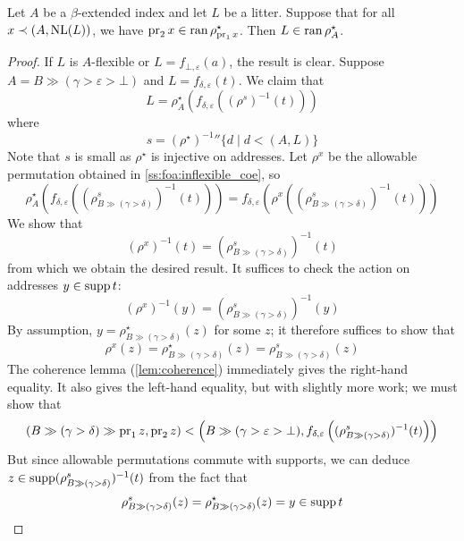 \begin{lemma}
    Let \( A \) be a \( \beta \)-extended index and let \( L \) be a litter.
    Suppose that for all \( x \prec (A, \operatorname{NL}(L)) \), we have \( \operatorname{pr}_2 x \in \operatorname{ran} \rho^\star_{\operatorname{pr}_1 x} \).
    Then \( L \in \operatorname{ran} \rho^\star_A \).
\end{lemma}
\begin{proof}
    If \( L \) is \( A \)-flexible or \( L = f_{\bot,\varepsilon}(a) \), the result is clear.
    Suppose \( A = B \gg (\gamma > \varepsilon > \bot) \) and \( L = f_{\delta,\varepsilon}(t) \).
    We claim that
    \[ L = \rho^\star_A(f_{\delta,\varepsilon}((\rho^s)^{-1}(t))) \]
    where
    \[ s = {(\rho^\star)^{-1}} '' \{ d \mid d < (A, L) \} \]
    Note that \( s \) is small as \( \rho^\star \) is injective on addresses.
    Let \( \rho^x \) be the allowable permutation obtained in \cref{ss:foa:inflexible_coe}, so
    \[ \rho^\star_A\left(f_{\delta,\varepsilon}\left((\rho^s_{B \gg (\gamma > \delta)})^{-1}(t)\right)\right) = f_{\delta,\varepsilon}\left(\rho^x\left((\rho^s_{B \gg (\gamma > \delta)})^{-1}(t)\right)\right) \]
    We show that
    \[ (\rho^x)^{-1}(t) = \left(\rho^s_{B \gg (\gamma > \delta)}\right)^{-1}(t) \]
    from which we obtain the desired result.
    It suffices to check the action on addresses \( y \in \operatorname{supp} t \):
    \[ (\rho^x)^{-1}(y) = \left(\rho^s_{B \gg (\gamma > \delta)}\right)^{-1}(y) \]
    By assumption, \( y = \rho^\star_{B \gg (\gamma > \delta)}(z) \) for some \( z \); it therefore suffices to show that
    \[ \rho^x(z) = \rho^\star_{B \gg (\gamma > \delta)}(z) = \rho^s_{B \gg (\gamma > \delta)}(z) \]
    The coherence lemma (\cref{lem:coherence}) immediately gives the right-hand equality.
    It also gives the left-hand equality, but with slightly more work; we must show that
    \[ (B \gg (\gamma > \delta) \gg \operatorname{pr}_1 z, \operatorname{pr}_2 z) < \left(B \gg (\gamma > \varepsilon > \bot), f_{\delta,\varepsilon}\left((\rho^s_{B \gg (\gamma > \delta)})^{-1}(t)\right)\right) \]
    But since allowable permutations commute with supports, we can deduce \( z \in \operatorname{supp} (\rho^s_{B \gg (\gamma > \delta)})^{-1}(t) \) from the fact that
    \[ \rho^s_{B \gg (\gamma > \delta)}(z) = \rho^\star_{B \gg (\gamma > \delta)}(z) = y \in \operatorname{supp} t \]
\end{proof}
